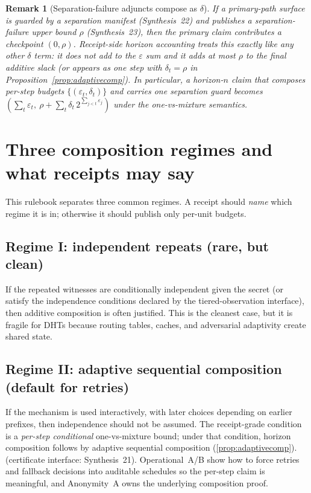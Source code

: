 \documentclass[11pt]{article}
\newtheorem{remark}{Remark}
\begin{document}
\begin{remark}[Separation-failure adjuncts compose as $\delta$]
If a primary-path surface is guarded by a separation manifest (Synthesis~22) and publishes a separation-failure upper bound $\rho$ (Synthesis~23), then the primary claim contributes a checkpoint $(0,\rho)$.
Receipt-side horizon accounting treats this exactly like any other $\delta$ term: it does not add to the $\varepsilon$ sum and it adds at most $\rho$ to the final additive slack (or appears as one step with $\delta_t=\rho$ in Proposition~\ref{prop:adaptivecomp}).\cite{series:primarysepmanifest,series:probsep}
In particular, a horizon-$n$ claim that composes per-step budgets $\{(\varepsilon_t,\delta_t)\}$ and carries one separation guard becomes
$(\sum_t\varepsilon_t,\ \rho + \sum_t \delta_t\,2^{\sum_{j<t}\varepsilon_j})$ under the one-vs-mixture semantics.
\end{remark}

\section{Three composition regimes and what receipts may say}
This rulebook separates three common regimes.
A receipt should \emph{name} which regime it is in; otherwise it should publish only per-unit budgets.

\subsection{Regime I: independent repeats (rare, but clean)}
If the repeated witnesses are conditionally independent given the secret (or satisfy the independence conditions declared by the tiered-observation interface), then additive composition is often justified.\cite{series:contractobjects,series:tieredobs}
This is the cleanest case, but it is fragile for DHTs because routing tables, caches, and adversarial adaptivity create shared state.

\subsection{Regime II: adaptive sequential composition (default for retries)}
If the mechanism is used interactively, with later choices depending on earlier prefixes, then independence should not be assumed.
The receipt-grade condition is a \emph{per-step conditional} one-vs-mixture bound; under that condition, horizon composition follows by adaptive sequential composition (\cref{prop:adaptivecomp}). (certificate interface: Synthesis~21).\cite{series:condcert}
Operational~A/B show how to force retries and fallback decisions into auditable schedules so the per-step claim is meaningful, and Anonymity~A owns the underlying composition proof.\cite{series:operationalA,series:operationalB,series:oddsinflation}
\end{document}
